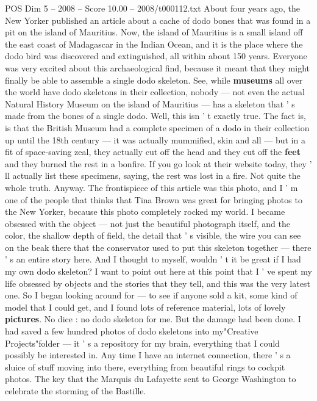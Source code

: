 \begin{textsample}{POS Dim 5 – 2008 – Score 10.00 – 2008/t000112.txt}  \label{ex:f5_pos_013}
About four years ago, the New Yorker published an article about a cache of dodo bones that was found in a pit on the island of Mauritius.
Now, the island of Mauritius is a small island off the east coast of Madagascar in the Indian Ocean, and it is the place where the dodo bird was discovered and extinguished, all within about 150 years.
Everyone was very excited about this archaeological find, because it meant that they might finally be able to assemble a single dodo skeleton.
See, while \textbf{museums} all over the world have dodo skeletons in their collection, nobody — not even the actual Natural History Museum on the island of Mauritius — has a skeleton that ' s made from the bones of a single dodo.
Well, this isn ' t exactly true.
The fact is, is that the British Museum had a complete specimen of a dodo in their collection up until the 18th century — it was actually mummified, skin and all — but in a fit of space-saving zeal, they actually cut off the head and they cut off the \textbf{feet} and they burned the rest in a bonfire.
If you go look at their website today, they ' ll actually list these specimens, saying, the rest was lost in a fire.
Not quite the whole truth.
Anyway.
The frontispiece of this article was this photo, and I ' m one of the people that thinks that Tina Brown was great for bringing photos to the New Yorker, because this photo completely rocked my world.
I became obsessed with the object — not just the beautiful photograph itself, and the color, the shallow depth of field, the detail that ' s visible, the wire you can see on the beak there that the conservator used to put this skeleton together — there ' s an entire story here.
And I thought to myself, wouldn ' t it be great if I had my own dodo skeleton?
I want to point out here at this point that I ' ve spent my life obsessed by objects and the stories that they tell, and this was the very latest one.
So I began looking around for — to see if anyone sold a kit, some kind of model that I could get, and I found lots of reference material, lots of lovely \textbf{pictures}.
No dice : no dodo skeleton for me.
But the damage had been done.
I had saved a few hundred photos of dodo skeletons into my"Creative Projects"folder — it ' s a repository for my brain, everything that I could possibly be interested in.
Any time I have an internet connection, there ' s a sluice of stuff moving into there, everything from beautiful rings to cockpit photos.
The key that the Marquis du Lafayette sent to George Washington to celebrate the storming of the Bastille.

\end{textsample}
